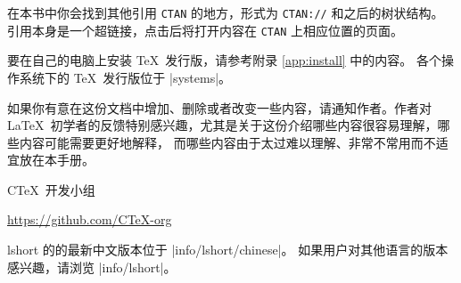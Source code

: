 在本书中你会找到其他引用 \texttt{CTAN} 的地方，形式为 \texttt{CTAN://} 和之后的树状结构。
引用本身是一个超链接，点击后将打开内容在 \texttt{CTAN} 上相应位置的页面。

要在自己的电脑上安装 \TeX\ 发行版，请参考附录 \ref{app:install} 中的内容。
各个操作系统下的 \TeX\ 发行版位于 \CTAN|systems|。

\bigskip
如果你有意在这份文档中增加、删除或者改变一些内容，请通知作者。作者对 \LaTeX\ 
初学者的反馈特别感兴趣，尤其是关于这份介绍哪些内容很容易理解，哪些内容可能需要更好地解释，
而哪些内容由于太过难以理解、非常不常用而不适宜放在本手册。

\bigskip
\begin{flushright}
C\TeX\ 开发小组\par
\url{https://github.com/CTeX-org}
\end{flushright}

\vfill

\noindent\begingroup\small lshort 的的最新中文版本位于 \CTAN|info/lshort/chinese|。
如果用户对其他语言的版本感兴趣，请浏览 \CTAN|info/lshort|。\endgroup

\endinput